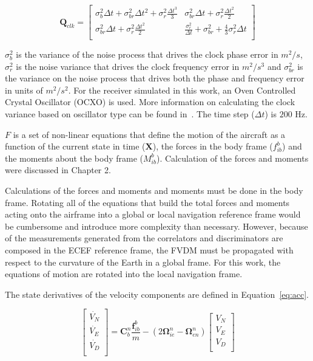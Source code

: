 \begin{equation}\label{eq:Qclk}
    \mathbf{Q}_{clk} =
    \begin{bmatrix}
        \sigma^2_b \Delta t + \sigma^2_{br}\Delta t^2 + \sigma^2_r \frac{\Delta t^3}{3} & \sigma^2_{br}\Delta t + \sigma^2_r \frac{\Delta t^2}{2}                      \\
        \sigma^2_{br} \Delta t + \sigma^2_r \frac{\Delta t^2}{2}                        & \frac{\sigma^2_r}{\Delta t} + \sigma^2_{br} + \frac{4}{3}\sigma^2_r \Delta t \\
    \end{bmatrix}
\end{equation}

\(\sigma^2_b\) is the variance of the noise process that drives the clock phase error in \(m^2/s\), \(\sigma^2_{r}\) is the noise variance that drives the clock frequency error in \(m^2/s^3\) and \(\sigma^2_{br}\) is the variance on the noise process that drives both the phase and frequency error in units of \(m^2/s^2\). For the receiver simulated in this work, an Oven Controlled Crystal Oscillator (OCXO) is used. More information on calculating the clock variance based on oscillator type can be found in~\cite{robertgroverbrownIntroductionRandomSignals2013}. The time step (\(\Delta t\)) is \(200\) Hz.

\(F\) is a set of non-linear equations that define the motion of the aircraft as a function of the current state in time (\(\mathbf{X}\)), the forces in the body frame (\(f_{ib}^b\)) and the moments about the body frame (\(M_{ib}^b\)). Calculation of the forces and moments were discussed in Chapter 2.

Calculations of the forces and moments and moments must be done in the body frame. Rotating all of the equations that build the total forces and moments acting onto the airframe into a global or local navigation reference frame would be cumbersome and introduce more complexity than necessary. However, because of the measurements generated from the correlators and discriminators are composed in the ECEF reference frame, the FVDM must be propagated with respect to the curvature of the Earth in a global frame. For this work, the equations of motion are rotated into the local navigation frame.

The state derivatives of the velocity components are defined in Equation~\ref{eq:acc}.

\begin{equation}\label{eq:acc}
    \begin{bmatrix}
        \dot{V_N} \\
        \dot{V_E} \\
        \dot{V_D} \\
    \end{bmatrix} =
    \mathbf{C}_{b}^{n}\frac{\mathbf{f}_{ib}^b}{m} - \left(2\mathbf{\Omega}_{ie}^n - \mathbf{\Omega}_{en}^n\right)
    \begin{bmatrix}
        V_N \\
        V_E \\
        V_D \\
    \end{bmatrix}
\end{equation}

